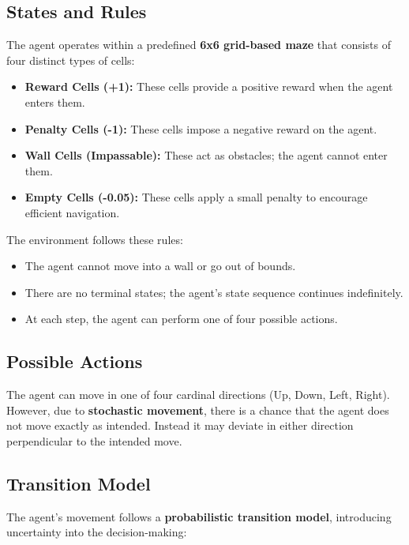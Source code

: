 \subsection{States and Rules}
The agent operates within a predefined \textbf{6x6 grid-based maze} that consists of four distinct types of cells:

\begin{itemize}
    \item \textbf{Reward Cells (+1):} These cells provide a positive reward when the agent enters them.
    \item \textbf{Penalty Cells (-1):} These cells impose a negative reward on the agent.
    \item \textbf{Wall Cells (Impassable):} These act as obstacles; the agent cannot enter them.
    \item \textbf{Empty Cells (-0.05):} These cells apply a small penalty to encourage efficient navigation.
\end{itemize}

\vspace{5pt} %

\noindent The environment follows these rules:

\begin{itemize}
    \item The agent cannot move into a wall or go out of bounds.
    \item There are no terminal states; the agent's state sequence continues indefinitely.
    \item At each step, the agent can perform one of four possible actions. 
\end{itemize}

\subsection{Possible Actions}
The agent can move in one of four cardinal directions (Up, Down, Left, Right).
However, due to \textbf{stochastic movement}, there is a chance that the agent does not move exactly as intended. Instead it may deviate in either direction perpendicular to the intended move.

\subsection{Transition Model}
The agent's movement follows a \textbf{probabilistic transition model}, introducing uncertainty into the decision-making:

